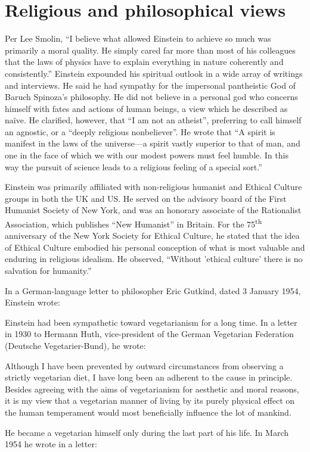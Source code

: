 \documentclass[twoside]{memoir}
\begin{document}
\section{Religious and philosophical views}\label{religious-and-philosophical-views}

Per Lee Smolin,  \enquote{I believe what allowed Einstein to achieve so much was primarily a moral quality. He simply cared far more than most of his colleagues that the laws of physics have to explain everything in nature coherently and consistently.} Einstein expounded his spiritual outlook in a wide array of writings and interviews. He said he had sympathy for the impersonal pantheistic God of Baruch Spinoza's philosophy. He did not believe in a personal god who concerns himself with fates and actions of human beings, a view which he described as naïve. He clarified, however, that \enquote{I am not an atheist}, preferring to call himself an agnostic, or a \enquote{deeply religious nonbeliever}. He wrote that \enquote{A spirit is manifest in the laws of the universe---a spirit vastly superior to that of man, and one in the face of which we with our modest powers must feel humble. In this way the pursuit of science leads to a religious feeling of a special sort.}

Einstein was primarily affiliated with non-religious humanist and Ethical Culture groups in both the UK and US. He served on the advisory board of the First Humanist Society of New York,\cite{mKToJ} and was an honorary associate of the Rationalist Association, which publishes \enquote{New Humanist} in Britain. For the 75\textsuperscript{th} anniversary of the New York Society for Ethical Culture, he stated that the idea of Ethical Culture embodied his personal conception of what is most valuable and enduring in religious idealism. He observed, \enquote{Without 'ethical culture' there is no salvation for humanity.}

In a German-language letter to philosopher  Eric Gutkind, dated 3 January 1954, Einstein wrote:

Einstein had been sympathetic toward vegetarianism for a long time. In a letter in 1930 to Hermann Huth, vice-president of the German Vegetarian Federation (Deutsche Vegetarier-Bund), he wrote:

\begin{displayquote}

Although I have been prevented by outward circumstances from observing a strictly vegetarian diet, I have long been an adherent to the cause in principle. Besides agreeing with the aims of vegetarianism for aesthetic and moral reasons, it is my view that a vegetarian manner of living by its purely physical effect on the human temperament would most beneficially influence the lot of mankind.

\end{displayquote}
He became a vegetarian himself only during the last part of his life. In March 1954 he wrote in a letter:
\end{document}
